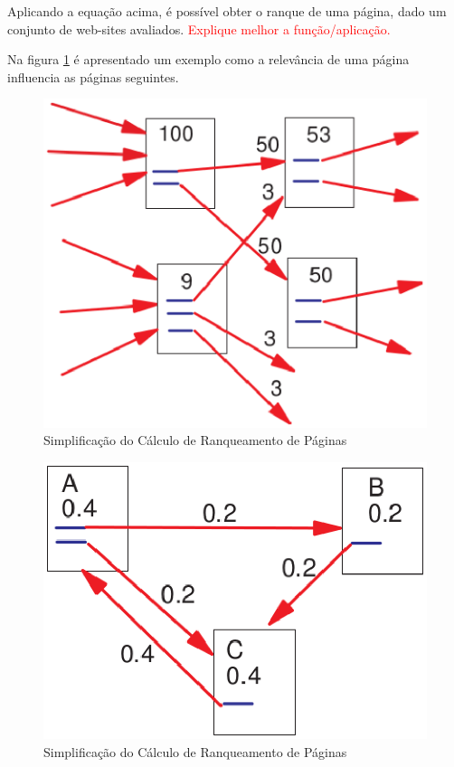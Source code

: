 Aplicando a equação acima, é possível obter o ranque de uma página, dado um conjunto de web-sites avaliados. \textcolor{red}{Explique melhor a função/aplicação.}

 Na figura \ref{fig:page_rank} é apresentado um exemplo como a relevância de uma página influencia as páginas seguintes.

\begin{figure}[!h]
    \centering
        \includegraphics[keepaspectratio=true,scale=0.5]{figuras/page_rank.eps}
    \caption{Simplificação do Cálculo de Ranqueamento de Páginas}
    \label{fig:page_rank}
\end{figure}

\begin{figure}[!h]
    \centering
        \includegraphics[keepaspectratio=true,scale=0.5]{figuras/page_rank2.eps}
    \caption{Simplificação do Cálculo de Ranqueamento de Páginas}
    \label{fig:page_rank2}
\end{figure}

